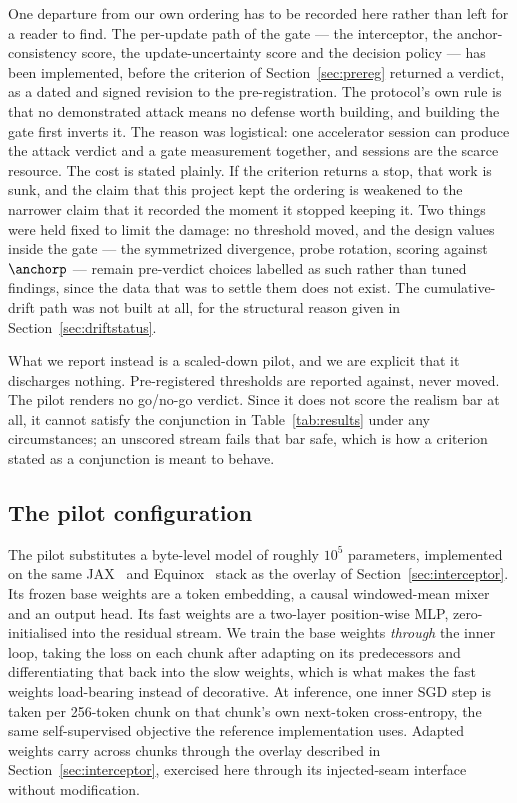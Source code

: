 One departure from our own ordering has to be recorded here rather than left for
a reader to find. The per-update path of the gate --- the interceptor, the
anchor-consistency score, the update-uncertainty score and the decision policy
--- has been implemented, before the criterion of Section~\ref{sec:prereg}
returned a verdict, as a dated and signed revision to the pre-registration. The
protocol's own rule is that no demonstrated attack means no defense worth
building, and building the gate first inverts it. The reason was logistical: one
accelerator session can produce the attack verdict and a gate measurement
together, and sessions are the scarce resource. The cost is stated plainly. If the
criterion returns a stop, that work is sunk, and the claim that this project kept
the ordering is weakened to the narrower claim that it recorded the moment it
stopped keeping it. Two things were held fixed to limit the damage: no threshold
moved, and the design values inside the gate --- the symmetrized divergence, probe
rotation, scoring against $\anchorp$ --- remain pre-verdict choices labelled as
such rather than tuned findings, since the data that was to settle them does not
exist. The cumulative-drift path was not built at all, for the structural reason
given in Section~\ref{sec:driftstatus}.

What we report instead is a scaled-down pilot, and we are explicit that it
discharges nothing. Pre-registered thresholds are reported against, never moved.
The pilot renders no go/no-go verdict. Since it does not score the realism bar at
all, it cannot satisfy the conjunction in Table~\ref{tab:results} under any
circumstances; an unscored stream fails that bar safe, which is how a criterion
stated as a conjunction is meant to behave.

\subsection{The pilot configuration}

The pilot substitutes a byte-level model of roughly $10^5$ parameters,
implemented on the same JAX~\cite{bradbury2018jax} and
Equinox~\cite{kidger2021equinox} stack as the overlay of
Section~\ref{sec:interceptor}. Its frozen base weights are a token embedding, a
causal windowed-mean mixer and an output head. Its fast weights are a two-layer
position-wise MLP, zero-initialised into the residual stream. We train the base
weights \emph{through} the inner loop, taking the loss on each chunk after
adapting on its predecessors and differentiating that back into the slow weights,
which is what makes the fast weights load-bearing instead of decorative. At
inference, one inner SGD step is taken per 256-token chunk on that chunk's own
next-token cross-entropy, the same self-supervised objective the reference
implementation uses. Adapted weights carry across chunks through the overlay
described in Section~\ref{sec:interceptor}, exercised here through its
injected-seam interface without modification.

